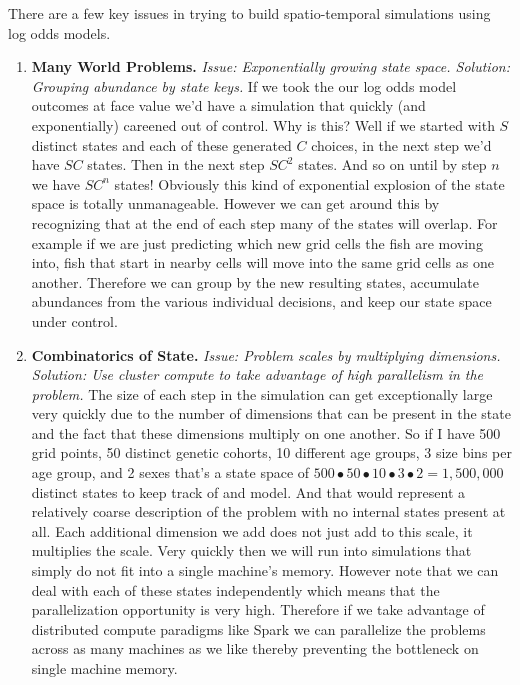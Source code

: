 \documentclass[11pt]{article}
\begin{document}
There are a few key issues in trying to build spatio-temporal simulations using log odds models.

\begin{enumerate}
\item \textbf{Many World Problems.} \textit{Issue: Exponentially growing state space. Solution: Grouping abundance by state keys.} \newline If we took the our log odds model outcomes at face value we'd have a simulation that quickly (and exponentially) careened out of control. Why is this? Well if we started with $S$ distinct states and each of these generated $C$ choices, in the next step we'd have $SC$ states. Then in the next step $SC^2$ states. And so on until by step $n$ we have $SC^n$ states! Obviously this kind of exponential explosion of the state space is totally unmanageable. However we can get around this by recognizing that at the end of each step many of the states will overlap. For example if we are just predicting which new grid cells the fish are moving into, fish that start in nearby cells will move into the same grid cells as one another. Therefore we can group by the new resulting states, accumulate abundances from the various individual decisions, and keep our state space under control.
\item \textbf{Combinatorics of State.} \textit{Issue: Problem scales by multiplying dimensions. Solution: Use cluster compute to take advantage of high parallelism in the problem.} \newline The size of each step in the simulation can get exceptionally large very quickly due to the number of dimensions that can be present in the state and the fact that these dimensions multiply on one another. So if I have 500 grid points, 50 distinct genetic cohorts, 10 different age groups, 3 size bins per age group, and 2 sexes that's a state space of $500 \bullet 50 \bullet 10 \bullet 3 \bullet 2 = 1,500,000$ distinct states to keep track of and model. And that would represent a relatively coarse description of the problem with no internal states present at all. Each additional dimension we add does not just add to this scale, it multiplies the scale. Very quickly then we will run into simulations that simply do not fit into a single machine's memory. However note that we can deal with each of these states independently which means that the parallelization opportunity is very high. Therefore if we take advantage of distributed compute paradigms like Spark we can parallelize the problems across as many machines as we like thereby preventing the bottleneck on single machine memory. 

\end{enumerate}
\end{document}
